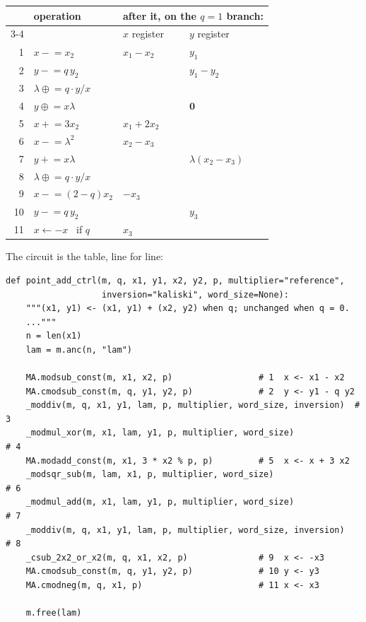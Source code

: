 \documentclass[11pt]{article}
\theoremstyle{plain}
\theoremstyle{remark}
\begin{document}
\begin{center}\small\setlength{\tabcolsep}{6pt}
\begin{tabular}{@{}rlll@{}}
\toprule
& operation & \multicolumn{2}{l}{after it, on the $q=1$ branch:}\\
\cmidrule(l){3-4}
& & $x$ register & $y$ register\\
\midrule
1 & $x \mathrel{-}= x_2$                      & $x_1-x_2$ & $y_1$\\
2 & $y \mathrel{-}= q\,y_2$                   & & $y_1-y_2$\\
3 & $\lambda \mathrel{\oplus}= q\cdot y/x$    & & \\
4 & $y \mathrel{\oplus}= x\lambda$            & & $\mathbf{0}$\\
5 & $x \mathrel{+}= 3x_2$                     & $x_1+2x_2$ & \\
6 & $x \mathrel{-}= \lambda^2$                & $x_2-x_3$ & \\
7 & $y \mathrel{+}= x\lambda$                 & & $\lambda(x_2-x_3)$\\
8 & $\lambda \mathrel{\oplus}= q\cdot y/x$    & & \\
9 & $x \mathrel{-}= (2-q)x_2$                 & $-x_3$ & \\
10 & $y \mathrel{-}= q\,y_2$                  & & $y_3$\\
11 & $x \leftarrow -x$ \ if $q$               & $x_3$ & \\
\bottomrule
\end{tabular}
\end{center}

\noindent
The circuit is the table, line for line:

\begin{lstlisting}
def point_add_ctrl(m, q, x1, y1, x2, y2, p, multiplier="reference",
                   inversion="kaliski", word_size=None):
    """(x1, y1) <- (x1, y1) + (x2, y2) when q; unchanged when q = 0.
    ..."""
    n = len(x1)
    lam = m.anc(n, "lam")

    MA.modsub_const(m, x1, x2, p)                 # 1  x <- x1 - x2
    MA.cmodsub_const(m, q, y1, y2, p)             # 2  y <- y1 - q y2
    _moddiv(m, q, x1, y1, lam, p, multiplier, word_size, inversion)  # 3
    _modmul_xor(m, x1, lam, y1, p, multiplier, word_size)             # 4
    MA.modadd_const(m, x1, 3 * x2 % p, p)         # 5  x <- x + 3 x2
    _modsqr_sub(m, lam, x1, p, multiplier, word_size)                  # 6
    _modmul_add(m, x1, lam, y1, p, multiplier, word_size)              # 7
    _moddiv(m, q, x1, y1, lam, p, multiplier, word_size, inversion)   # 8
    _csub_2x2_or_x2(m, q, x1, x2, p)              # 9  x <- -x3
    MA.cmodsub_const(m, q, y1, y2, p)             # 10 y <- y3
    MA.cmodneg(m, q, x1, p)                       # 11 x <- x3

    m.free(lam)
\end{lstlisting}
\end{document}
